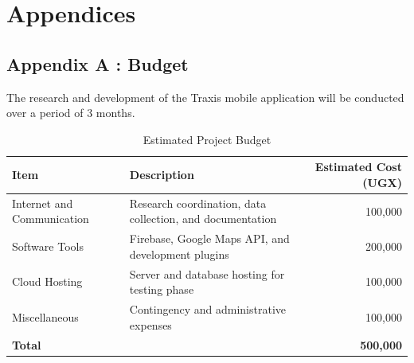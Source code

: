 \chapter*{Appendices}


\section*{Appendix A : Budget}
The research and development of the Traxis mobile application will be conducted
over a period of 3 months.


\begin{table}[h]
\centering
\begin{tabularx}{\textwidth}{@{}lXr@{}}  %
\toprule

\textbf{Item} & \textbf{Description} & \textbf{Estimated Cost (UGX)} \\
\midrule Internet and Communication & Research coordination, data collection,
and documentation & 100,000 \\ Software Tools & Firebase, Google Maps API, and
development plugins & 200,000 \\ Cloud Hosting & Server and database hosting for
testing phase & 100,000 \\ Miscellaneous & Contingency and administrative
expenses & 100,000 \\ \bottomrule

\textbf{Total} & & \textbf{500,000} \\
\end{tabularx}
\caption{Estimated Project Budget}
\end{table}


\clearpage



